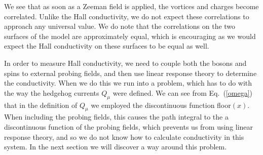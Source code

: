 \documentclass[prb,twocolumn]{revtex4-1}
\begin{document}
We see that as soon as a Zeeman field is applied, the vortices and charges become correlated. Unlike the Hall conductivity, we do not expect these correlations to approach any universal value. We do note that the correlations on the two surfaces of the model are approximately equal, which is encouraging as we would expect the Hall conductivity on these surfaces to be equal as well.

In order to measure Hall conductivity, we need to couple both the bosons and spins to external probing fields, and then use linear response theory to determine the conductivity. When we do this we run into a problem, which has to do with the way the hedgehog currents $Q_\mu$ were defined. We can see from Eq.~(\ref{omega}) that in the definition of $Q_\mu$ we employed the discontinuous function floor$(x)$. When including the probing fields, this causes the path integral to the a discontinuous function of the probing fields, which prevents us from using linear response theory, and so we do not know how to calculate conductivity in this system. In the next section we will discover a way around this problem.
\end{document}
